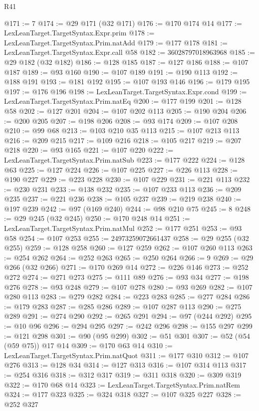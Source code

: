 \begin{lexlean}{R41}
\begin{coremodule}
@171 := 7
@174 := @29 @171 (@32 @171)
@176 := @170 @174 @14
@177 := LexLeanTarget.TargetSyntax.Expr.prim
@178 := LexLeanTarget.TargetSyntax.Prim.natAdd
@179 := @177 @178
@181 := LexLeanTarget.TargetSyntax.Expr.call @58
@182 := 36028797018963968
@185 := @29 @182 (@32 @182)
@186 := @128 @185
@187 := @127 @186
@188 := @107 @187
@189 := @93 @160
@190 := @107 @189
@191 := @190 @113
@192 := @188 @191
@193 := @181 @192
@195 := @107 @193 @146
@196 := @179 @195
@197 := @176 @196
@198 := LexLeanTarget.TargetSyntax.Expr.cond
@199 := LexLeanTarget.TargetSyntax.Prim.natEq
@200 := @177 @199
@201 := @128 @58
@202 := @127 @201
@204 := @107 @202 @113
@205 := @190 @204
@206 := @200 @205
@207 := @198 @206
@208 := @93 @174
@209 := @107 @208
@210 := @99 @68
@213 := @103 @210 @35 @113
@215 := @107 @213 @113
@216 := @209 @215
@217 := @109 @216
@218 := @105 @217
@219 := @207 @218
@220 := @93 @165
@221 := @107 @220
@222 := LexLeanTarget.TargetSyntax.Prim.natSub
@223 := @177 @222
@224 := @128 @63
@225 := @127 @224
@226 := @107 @225
@227 := @226 @113
@228 := @190 @227
@229 := @223 @228
@230 := @107 @229
@231 := @221 @113
@232 := @230 @231
@233 := @138 @232
@235 := @107 @233 @113
@236 := @209 @235
@237 := @221 @236
@238 := @105 @237
@239 := @219 @238
@240 := @197 @239
@242 := @97 (@169 @240)
@244 := @98 @210 @75
@245 := 8
@248 := @29 @245 (@32 @245)
@250 := @170 @248 @14
@251 := LexLeanTarget.TargetSyntax.Prim.natMul
@252 := @177 @251
@253 := @93 @58
@254 := @107 @253
@255 := 24973259072661437
@258 := @29 @255 (@32 @255)
@259 := @128 @258
@260 := @127 @259
@262 := @107 @260 @113
@263 := @254 @262
@264 := @252 @263
@265 := @250 @264
@266 := 9
@269 := @29 @266 (@32 @266)
@271 := @170 @269 @14
@272 := @226 @146
@273 := @252 @272
@274 := @271 @273
@275 := @111 @89
@276 := @93 @34
@277 := @198 @276
@278 := @93 @248
@279 := @107 @278
@280 := @93 @269
@282 := @107 @280 @113
@283 := @279 @282
@284 := @223 @283
@285 := @277 @284
@286 := @179 @283
@287 := @285 @286
@289 := @107 @287 @113
@290 := @275 @289
@291 := @274 @290
@292 := @265 @291
@294 := @97 (@244 @292)
@295 := @10 @96
@296 := @294 @295
@297 := @242 @296
@298 := @155 @297
@299 := @121 @298
@301 := @90 (@95 @299)
@302 := @51 @301
@307 := @52 (@54 (@59 @75)) @17 @14
@309 := @170 @63 @14
@310 := LexLeanTarget.TargetSyntax.Prim.natQuot
@311 := @177 @310
@312 := @107 @276
@313 := @128 @34
@314 := @127 @313
@316 := @107 @314 @113
@317 := @254 @316
@318 := @312 @317
@319 := @311 @318
@320 := @309 @319
@322 := @170 @68 @14
@323 := LexLeanTarget.TargetSyntax.Prim.natRem
@324 := @177 @323
@325 := @324 @318
@327 := @107 @325 @227
@328 := @252 @327

\end{coremodule}
\end{lexlean}
